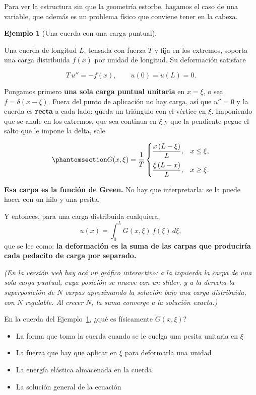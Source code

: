 \documentclass[
  spanish,
  a4paper,
]{scrbook}
\providecommand{\tightlist}{%
  \setlength{\itemsep}{0pt}\setlength{\parskip}{0pt}}
\theoremstyle{definition}
\theoremstyle{plain}
\theoremstyle{definition}
\newtheorem{example}{Ejemplo}[chapter]
\theoremstyle{plain}
\theoremstyle{definition}
\theoremstyle{remark}
\begin{document}
Para ver la estructura sin que la geometría estorbe, hagamos el caso de
una variable, que además es un problema físico que conviene tener en la
cabeza.

\begin{example}[Una cuerda con una carga
puntual]\protect\hypertarget{exm-green-cuerda}{}\label{exm-green-cuerda}

Una cuerda de longitud \(L\), tensada con fuerza \(T\) y fija en los
extremos, soporta una carga distribuida \(f(x)\) por unidad de longitud.
Su deformación satisface

\[
T\,u'' = -f(x), \qquad u(0)=u(L)=0 .
\]

Pongamos primero \textbf{una sola carga puntual unitaria} en \(x=\xi\),
o sea \(f = \delta(x-\xi)\). Fuera del punto de aplicación no hay carga,
así que \(u''=0\) y la cuerda es \textbf{recta} a cada lado: queda un
triángulo con el vértice en \(\xi\). Imponiendo que se anule en los
extremos, que sea continua en \(\xi\) y que la pendiente pegue el salto
que le impone la delta, sale

\begin{equation}\protect\phantomsection\label{eq-green-cuerda}{
G(x,\xi) = \frac{1}{T}
\begin{cases}
\dfrac{x\,(L-\xi)}{L}, & x \le \xi, \\[8pt]
\dfrac{\xi\,(L-x)}{L}, & x \ge \xi .
\end{cases}
}\end{equation}

\textbf{Esa carpa es la función de Green.} No hay que interpretarla: se
la puede hacer con un hilo y una pesita.

Y entonces, para una carga distribuida cualquiera, \[
u(x) = \int_0^L G(x,\xi)\,f(\xi)\,d\xi ,
\] que se lee como: \textbf{la deformación es la suma de las carpas que
produciría cada pedacito de carga por separado.}

\end{example}

\emph{(En la versión web hay acá un gráfico interactivo: a la izquierda
la carpa de una sola carga puntual, cuya posición se mueve con un
slider, y a la derecha la superposición de \(N\) carpas aproximando la
solución bajo una carga distribuida, con \(N\) regulable. Al crecer
\(N\), la suma converge a la solución exacta.)}

En la cuerda del Ejemplo~\ref{exm-green-cuerda}, ¿qué es físicamente
\(G(x,\xi)\)?

\begin{itemize}
\tightlist
\item
  {La forma que toma la cuerda cuando se le cuelga una pesita unitaria
  en \(\xi\)}
\item
  {La fuerza que hay que aplicar en \(\xi\) para deformarla una unidad}
\item
  {La energía elástica almacenada en la cuerda}
\item
  {La solución general de la ecuación}
\end{itemize}
\end{document}
